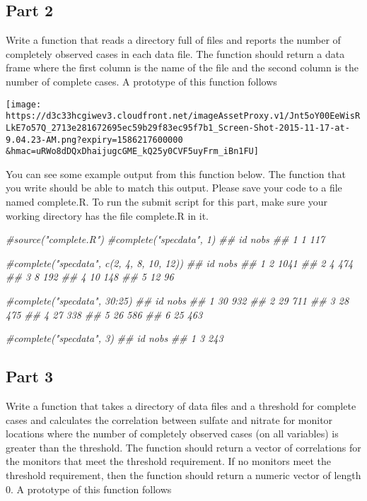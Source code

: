 \documentclass[
]{article}
\newenvironment{Shaded}{\begin{snugshade}}{\end{snugshade}}
\newcommand{\CommentTok}[1]{\textcolor[rgb]{0.56,0.35,0.01}{\textit{#1}}}
\begin{document}
\hypertarget{part-2}{%
\subsection{Part 2}\label{part-2}}

Write a function that reads a directory full of files and reports the
number of completely observed cases in each data file. The function
should return a data frame where the first column is the name of the
file and the second column is the number of complete cases. A prototype
of this function follows

\texttt{[image: https://d3c33hcgiwev3.cloudfront.net/imageAssetProxy.v1/Jnt5oY00EeWisRLkE7o57Q\_2713e281672695ec59b29f83ec95f7b1\_Screen-Shot-2015-11-17-at-9.04.23-AM.png?expiry=1586217600000\\\&hmac=uRWo8dDQxDhaijugcGME\_kQ25y0CVF5uyFrm\_iBn1FU]}

You can see some example output from this function below. The function
that you write should be able to match this output. Please save your
code to a file named complete.R. To run the submit script for this part,
make sure your working directory has the file complete.R in it.

\begin{Shaded}
\begin{Highlighting}[]
\CommentTok{#source("complete.R")}
\CommentTok{#complete("specdata", 1)}
\CommentTok{##   id nobs}
\CommentTok{## 1  1  117}

\CommentTok{#complete("specdata", c(2, 4, 8, 10, 12))}
\CommentTok{##   id nobs}
\CommentTok{## 1  2 1041}
\CommentTok{## 2  4  474}
\CommentTok{## 3  8  192}
\CommentTok{## 4 10  148}
\CommentTok{## 5 12   96}

\CommentTok{#complete("specdata", 30:25)}
\CommentTok{##   id nobs}
\CommentTok{## 1 30  932}
\CommentTok{## 2 29  711}
\CommentTok{## 3 28  475}
\CommentTok{## 4 27  338}
\CommentTok{## 5 26  586}
\CommentTok{## 6 25  463}

\CommentTok{#complete("specdata", 3)}
\CommentTok{##   id nobs}
\CommentTok{## 1  3  243}
\end{Highlighting}
\end{Shaded}

\hypertarget{part-3}{%
\subsection{Part 3}\label{part-3}}

Write a function that takes a directory of data files and a threshold
for complete cases and calculates the correlation between sulfate and
nitrate for monitor locations where the number of completely observed
cases (on all variables) is greater than the threshold. The function
should return a vector of correlations for the monitors that meet the
threshold requirement. If no monitors meet the threshold requirement,
then the function should return a numeric vector of length 0. A
prototype of this function follows
\end{document}

